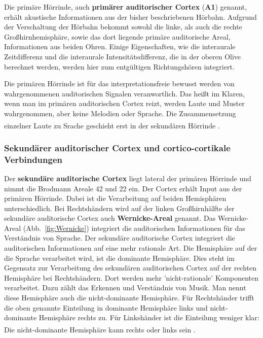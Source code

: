 \documentclass[12pt,a4paper,pdftex]{article}
\begin{document}
Die primäre Hörrinde, auch \textbf{primärer auditorischer Cortex} (\textbf{A1}) genannt, erhält akustische Informationen aus der bisher beschriebenen Hörbahn. Aufgrund der Verschaltung der Hörbahn bekommt sowohl die linke, als auch die rechte Großhirnhemisphäre, sowie das dort liegende primäre auditorische Areal, Informationen aus beiden Ohren. Einige Eigenschaften, wie die interaurale Zeitdifferenz und die interaurale Intensitätsdifferenz, die in der oberen Olive berechnet werden, werden hier zum entgültigen Richtungshören integriert. 

Die primären Hörrinde ist für das interpretationsfreie bewusst werden von wahrgenommenen auditorischen Signalen veranwortlich. Das heißt im Klaren, wenn man im primären auditorischen Cortex reizt, werden Laute und Muster wahrgenommen, aber keine Melodien oder Sprache. Die Zusammensetzung einzelner Laute zu Srache geschieht erst in der sekundären Hörrinde \textsuperscript{\cite[9.9]{trepel2011neuroanatomie}}.

\subsubsection*{Sekundärer auditorischer Cortex und cortico-cortikale Verbindungen}

Der \textbf{sekundäre auditorische Cortex}  liegt lateral der primären Hörrinde und nimmt die Brodmann Areale 42 und 22 ein. Der Cortex erhält Input aus der primären Hörrinde. Dabei ist die Verarbeitung auf beiden Hemisphären unterschiedlich. Bei Rechtshändern wird auf der linken Großhirnhälfte der sekundäre auditorische Cortex auch \textbf{Wernicke-Areal}  genannt. Das Wernicke-Areal (Abb.~\ref{fig:Wernicke}) integriert die auditorischen Informationen für das Verständnis von Sprache. Der sekundäre auditorische Cortex integriert die auditorischen Informationen auf eine mehr rationale Art. Die Hemisphäre auf der die Sprache verarbeitet wird, ist die dominante Hemisphäre. Dies steht im Gegensatz zur Verarbeitung des sekundären auditorischen Cortex auf der rechten Hemisphäre bei Rechtshändern. Dort werden mehr 'nicht-rationale' Komponenten verarbeitet. Dazu zählt das Erkennen und Verständnis von Musik. Man nennt diese Hemisphäre auch die nicht-dominante Hemisphäre. Für Rechtshänder trifft die oben genannte Einteilung in dominante Hemisphäre links und nicht-dominante Hemisphäre rechts zu. Für Linkshänder ist die Einteilung weniger klar: Die nicht-dominante Hemisphäre kann rechts oder links sein \textsuperscript{\cite{trepel2011neuroanatomie}}.
\end{document}
